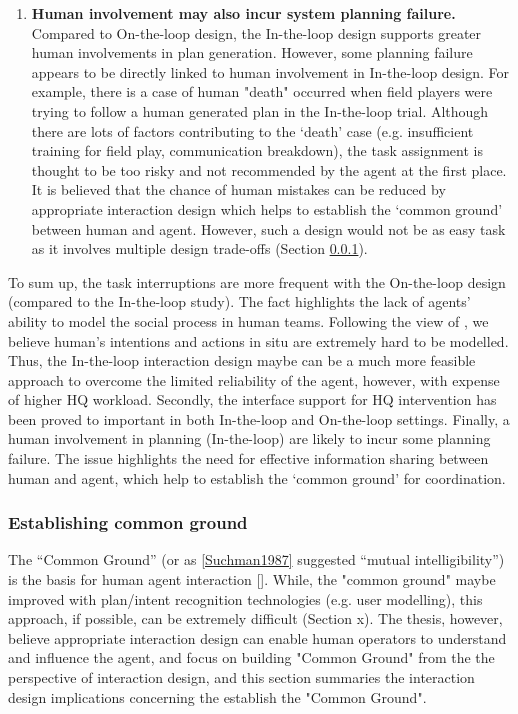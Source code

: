 \begin{enumerate}
\item \textbf{Human involvement may also incur system planning failure.} \\
Compared to On-the-loop design, the In-the-loop design supports greater human involvements in plan generation. However, some planning failure appears to be directly linked to human involvement in In-the-loop design. For example, there is a case of  human "death" occurred  when field players were trying to follow a human generated plan in the In-the-loop trial.  Although there are lots of factors contributing to the `death' case (e.g. insufficient training for field play, communication breakdown), the task assignment is thought to be too risky and not recommended by the agent at the first place. It is believed that the chance of human mistakes can be reduced by appropriate interaction design which helps to establish the `common ground' between human and agent. However, such a design would not be as easy task as it involves multiple design trade-offs  (Section \ref{sec:conclusionCG}).
\end{enumerate}

To sum up, the task interruptions are more frequent with the On-the-loop design (compared to the In-the-loop study). The fact highlights the lack of agents' ability to model the social process in human teams. Following the view of \cite{Suchman1987}, we believe human's intentions and actions in situ are extremely hard to be modelled. Thus, the In-the-loop interaction design maybe can be a much more feasible approach to overcome the limited reliability of the agent, however, with expense of higher HQ workload. Secondly, the interface support for HQ intervention has been proved to important in both In-the-loop and On-the-loop settings. Finally, a human involvement in planning (In-the-loop) are likely to incur some planning failure. The issue highlights the need for effective information sharing between human and agent, which help to establish the `common ground' for coordination. \\


\subsubsection{Establishing common ground} \label{sec:conclusionCG}
The ``Common Ground'' (or as \ref{Suchman1987} suggested ``mutual intelligibility'') is the basis for human agent interaction [].  While, the "common ground" maybe improved with plan/intent recognition technologies (e.g. user modelling), this approach, if possible, can be extremely difficult (Section x). The thesis, however, believe appropriate interaction design can enable human operators to understand and influence the agent, and focus on building "Common Ground" from the the perspective of interaction design, and this section summaries the interaction design implications concerning the establish the  "Common Ground".\\

